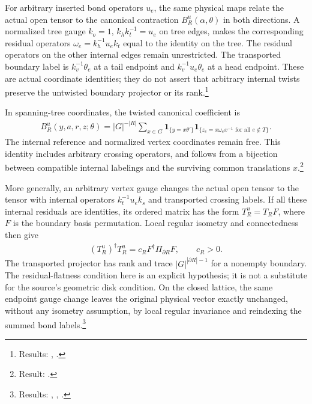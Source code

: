 \documentclass{article}
\begin{document}
For arbitrary inserted bond operators $u_e$, the same physical maps
relate the actual open tensor to the canonical contraction
$B_R^u(\alpha,\theta)$ in both directions. A normalized tree gauge
$k_o=1$, $k_hk_t^{-1}=u_e$ on tree edges, makes the corresponding
residual operators $\omega_e=k_h^{-1}u_ek_t$ equal to the identity on
the tree. The residual operators on the other internal edges remain
unrestricted. The transported boundary label is
$k_v^{-1}\theta_e$ at a tail endpoint and
$k_v^{-1}u_e\theta_e$ at a head endpoint. These are actual
coordinate identities; they do not assert that arbitrary internal
twists preserve the untwisted boundary projector or its rank.\footnote{Results:
    ,
    .}

In spanning-tree coordinates, the twisted canonical coefficient is
\begin{align}
 B_R^u(y,a,r,z;\theta)
 = |G|^{-|R|}\sum_{x\in G}
   \mathbf 1_{\{y=x\theta'\}}
   \mathbf 1_{\{z_e=x\omega_e x^{-1}\text{ for all }e\notin T\}}.
    \label{eq:rmp_peps_qd_twisted_canonical_block}
\end{align}
The internal reference and normalized vertex coordinates remain free.
This identity includes arbitrary crossing operators, and follows from a
bijection between compatible internal labelings and the surviving
common translations $x$.\footnote{Result:
    .}

More generally, an arbitrary vertex gauge changes the actual open
tensor to the tensor with internal operators $k_t^{-1}u_ek_s$ and
transported crossing labels. If all these internal residuals are
identities, its ordered matrix has the form $T_R^u=T_RF$, where $F$ is
the boundary basis permutation. Local regular isometry and connectedness
then give
\begin{align}
 (T_R^u)^\dagger T_R^u
   =c_R F^\dagger\Pi_{\partial R}F,\qquad c_R>0.
    \label{eq:rmp_peps_qd_transported_gram}
\end{align}
The transported projector has rank and trace $|G|^{|\partial R|-1}$
for a nonempty boundary. The residual-flatness condition here is an
explicit hypothesis; it is not a substitute for the source's geometric
disk condition. On the closed lattice, the same endpoint gauge change
leaves the original physical vector exactly unchanged, without any
isometry assumption, by local regular invariance and reindexing the
summed bond labels.\footnote{Results:
    ,
    ,
    .}
\end{document}
